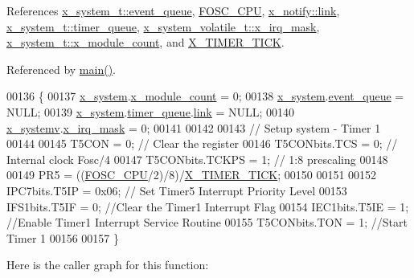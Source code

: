 References \hyperlink{a00037_source_l00079}{x\+\_\+system\+\_\+t\+::event\+\_\+queue}, \hyperlink{a00072_source_l00035}{F\+O\+S\+C\+\_\+\+C\+P\+U}, \hyperlink{a00036_source_l00072}{x\+\_\+notify\+::link}, \hyperlink{a00037_source_l00081}{x\+\_\+system\+\_\+t\+::timer\+\_\+queue}, \hyperlink{a00037_source_l00096}{x\+\_\+system\+\_\+volatile\+\_\+t\+::x\+\_\+irq\+\_\+mask}, \hyperlink{a00037_source_l00076}{x\+\_\+system\+\_\+t\+::x\+\_\+module\+\_\+count}, and \hyperlink{a00036_source_l00045}{X\+\_\+\+T\+I\+M\+E\+R\+\_\+\+T\+I\+C\+K}.



Referenced by \hyperlink{a00048_source_l00080}{main()}.


\begin{DoxyCode}
00136 \{
00137     \hyperlink{a00037_ae4d7967b507ca26e3ee1231215b03321}{x\_system}.\hyperlink{a00037_a80c19e87a59b3ee9def711195641cd26}{x\_module\_count}        = 0;
00138     \hyperlink{a00037_ae4d7967b507ca26e3ee1231215b03321}{x\_system}.\hyperlink{a00037_aae3e0af6b968bca8cea3ebff4b8918cb}{event\_queue}           = NULL;
00139     \hyperlink{a00037_ae4d7967b507ca26e3ee1231215b03321}{x\_system}.\hyperlink{a00037_a10669284e4e6a0d578a68a0b5fbe0d5b}{timer\_queue}.\hyperlink{a00036_ac1b431c0d2de68ce090f223b32f212b5}{link}      = NULL;
00140     \hyperlink{a00037_ad839c033d3d00cdcc6032038182be270}{x\_systemv}.\hyperlink{a00037_a1385e454a9fbfdfe2af2b8a743789483}{x\_irq\_mask}           = 0;
00141 
00142 
00143     \textcolor{comment}{// Setup system - Timer 1}
00144     
00145     T5CON = 0;                  \textcolor{comment}{// Clear the register}
00146     T5CONbits.TCS   = 0;        \textcolor{comment}{// Internal clock Fosc/4}
00147     T5CONbits.TCKPS = 1;        \textcolor{comment}{//    1:8 prescaling}
00148 
00149     PR5 = ((\hyperlink{a00072_a64b7f2fd4683ad3dcd74ccab1eba40d7}{FOSC\_CPU}/2)/8)/\hyperlink{a00036_ac606e478c91dc9a2ddc0816152b18979}{X\_TIMER\_TICK};
00150     
00151     
00152     IPC7bits.T5IP = 0x06;         \textcolor{comment}{// Set Timer5 Interrupt Priority Level}
00153     IFS1bits.T5IF = 0;            \textcolor{comment}{//Clear the Timer1 Interrupt Flag}
00154     IEC1bits.T5IE = 1;            \textcolor{comment}{//Enable Timer1 Interrupt Service Routine}
00155     T5CONbits.TON = 1;            \textcolor{comment}{//Start Timer 1}
00156 
00157 \}
\end{DoxyCode}


Here is the caller graph for this function\+:


